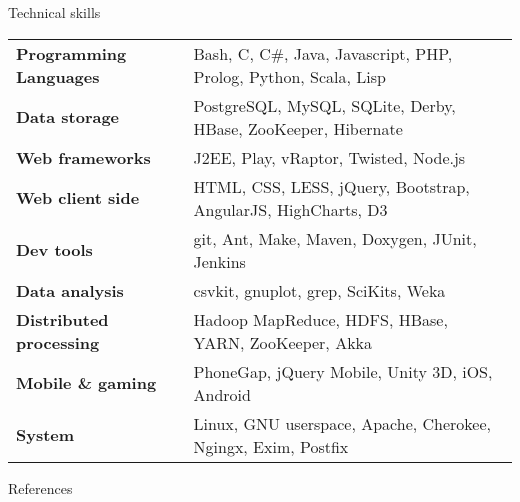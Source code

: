 \documentclass{resume} %
\begin{document}
\begin{rSection}{Technical skills}

\begin{tabular}{ @{} >{\bfseries}l @{\hspace{6ex}} l }
Programming Languages & Bash, C, C\#, Java, Javascript, PHP, Prolog, Python, Scala, Lisp \\
Data storage & PostgreSQL, MySQL, SQLite, Derby, HBase, ZooKeeper, Hibernate \\
Web frameworks & J2EE, Play, vRaptor, Twisted, Node.js \\
Web client side & HTML, CSS, LESS, jQuery, Bootstrap, AngularJS, HighCharts, D3 \\
Dev tools & git, Ant, Make, Maven, Doxygen, JUnit, Jenkins \\
Data analysis & csvkit, gnuplot, grep, SciKits, Weka \\
Distributed processing & Hadoop MapReduce, HDFS, HBase, YARN, ZooKeeper, Akka \\
Mobile \& gaming & PhoneGap, jQuery Mobile, Unity 3D, iOS, Android \\
System & Linux, GNU userspace, Apache, Cherokee, Ngingx, Exim, Postfix
\end{tabular}

\end{rSection}

\begin{rSection}{References}

\end{rSection}





\end{document}
